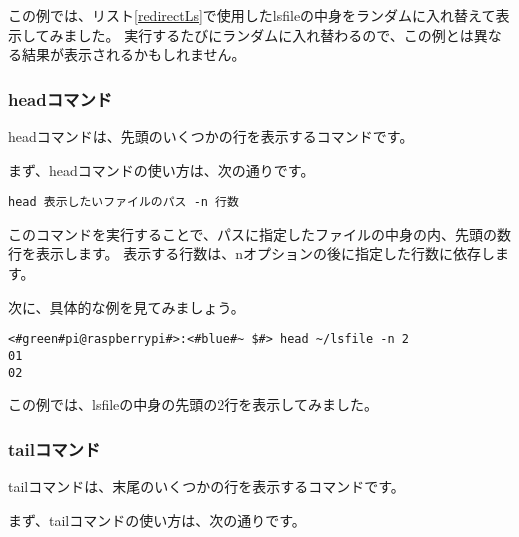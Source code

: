 この例では、リスト\ref{redirectLs}で使用したlsfileの中身をランダムに入れ替えて表示してみました。
実行するたびにランダムに入れ替わるので、この例とは異なる結果が表示されるかもしれません。

\begin{tcolorbox}[title=\useOmetoi]
    \begin{enumerate}
    \end{enumerate}
\end{tcolorbox}

\subsubsection{headコマンド}
headコマンドは、先頭のいくつかの行を表示するコマンドです。

まず、headコマンドの使い方は、次の通りです。

\begin{lstlisting}[caption=headコマンドの使い方, label=head_usage]
head 表示したいファイルのパス -n 行数
\end{lstlisting}

このコマンドを実行することで、パスに指定したファイルの中身の内、先頭の数行を表示します。
表示する行数は、nオプションの後に指定した行数に依存します。

次に、具体的な例を見てみましょう。

\begin{lstlisting}[caption=headコマンドの実行例, label=shuf_example]
<#green#pi@raspberrypi#>:<#blue#~ $#> head ~/lsfile -n 2
01
02
\end{lstlisting}

この例では、lsfileの中身の先頭の2行を表示してみました。

\begin{tcolorbox}[title=\useOmetoi]
    \begin{enumerate}
    \end{enumerate}
\end{tcolorbox}

\subsubsection{tailコマンド}
tailコマンドは、末尾のいくつかの行を表示するコマンドです。

まず、tailコマンドの使い方は、次の通りです。

